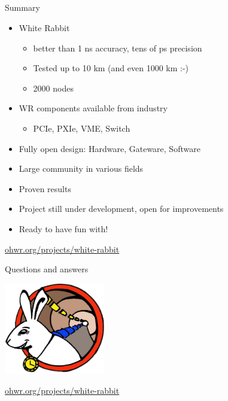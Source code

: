 \documentclass[compress,red]{beamer}
\begin{document}
\subsection{}
\begin{frame}{Summary}


    \begin{itemize}
      \item White Rabbit
      \begin{itemize}
	\item better than 1 ns accuracy, tens of ps precision
	\item Tested up to 10 km (and even 1000 km :-)
	\item 2000 nodes
      \end{itemize}
      \item WR components available from industry
      \begin{itemize}
	\item PCIe, PXIe, VME, Switch
      \end{itemize}
      \item Fully open design: Hardware, Gateware, Software
      \item Large community in various fields
      \item Proven results
      \item Project still under development, open for improvements
      \item Ready to have fun with!
    \end{itemize}    

\begin{center}
\href{http://ohwr.org/projects/white-rabbit}{ohwr.org/projects/white-rabbit}
\end{center}

 
\end{frame}
\begin{frame}{Questions and answers}

    \begin{center}
    \includegraphics[height=4.0cm]{../../figures/logo/WRlogo.jpg}
    \end{center}

\begin{center}
\href{http://ohwr.org/projects/white-rabbit}{ohwr.org/projects/white-rabbit}
\end{center}
\end{frame}
\end{document}
